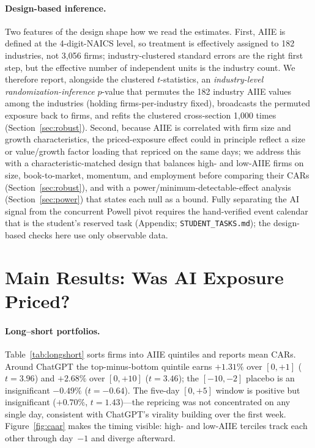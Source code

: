 \documentclass[12pt]{article}
\begin{document}
\paragraph{Design-based inference.} Two features of the design shape how we read the estimates.
First, AIIE is defined at the 4-digit-NAICS level, so treatment is effectively assigned to 182
industries, not 3{,}056 firms; industry-clustered standard errors are the right first step, but
the effective number of independent units is the industry count. We therefore report, alongside
the clustered $t$-statistics, an \emph{industry-level randomization-inference} $p$-value that
permutes the 182 industry AIIE values among the industries (holding firms-per-industry fixed),
broadcasts the permuted exposure back to firms, and refits the clustered cross-section
1{,}000 times (Section~\ref{sec:robust}). Second, because AIIE is correlated with firm size and
growth characteristics, the priced-exposure effect could in principle reflect a size or
value/growth factor loading that repriced on the same days; we address this with a
characteristic-matched design that balances high- and low-AIIE firms on size, book-to-market,
momentum, and employment before comparing their CARs (Section~\ref{sec:robust}), and with a
power/minimum-detectable-effect analysis (Section~\ref{sec:power}) that states each null as a
bound. Fully separating the AI signal from the concurrent Powell pivot requires the
hand-verified event calendar that is the student's reserved task (Appendix;
\texttt{STUDENT\_TASKS.md}); the design-based checks here use only observable data.

\section{Main Results: Was AI Exposure Priced?}\label{sec:res}
\paragraph{Long--short portfolios.} Table~\ref{tab:longshort} sorts firms into AIIE
quintiles and reports mean CARs. Around ChatGPT the top-minus-bottom quintile earns
$+1.31\%$ over $[0,+1]$ ($t=3.96$) and $+2.68\%$ over $[0,+10]$ ($t=3.46$); the
$[-10,-2]$ placebo is an insignificant $-0.49\%$ ($t=-0.64$). The five-day $[0,+5]$
window is positive but insignificant ($+0.70\%$, $t=1.43$)---the repricing was not
concentrated on any single day, consistent with ChatGPT's virality building over the
first week. Figure~\ref{fig:caar} makes the timing visible: high- and low-AIIE terciles
track each other through day~$-1$ and diverge afterward.
\end{document}
